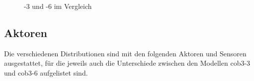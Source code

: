 \begin{figure}[htb]
  \centering
  \hfill
  \caption{-3 und -6 im Vergleich}
  \label{fig:vgl3336}
\end{figure}

\subsection{Aktoren}

Die verschiedenen \cob Distributionen sind mit den folgenden Aktoren und Sensoren
ausgestattet, für die jeweils auch die Unterschiede zwischen den Modellen cob3-3 und
cob3-6 aufgelistet sind.

